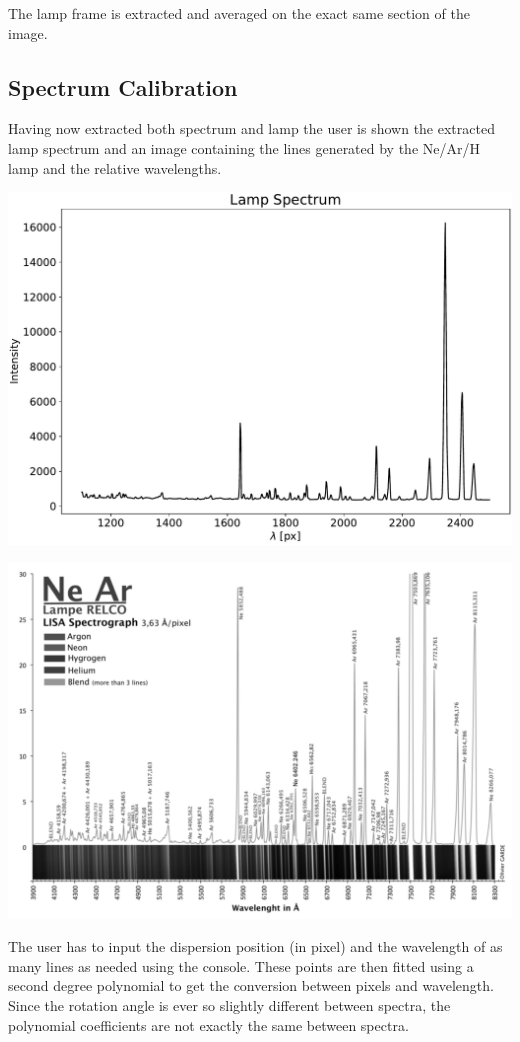\documentclass[a4paper]{article}
\newenvironment{Figure}
	{\par\medskip\noindent\minipage{\linewidth}}
	{\endminipage\par\medskip}
\begin{document}
\begin{multicols}{2}
			The lamp frame is extracted and averaged on the exact same section of the image.\\
			
		\subsection{Spectrum Calibration}
			Having now extracted both spectrum and lamp the user is shown the extracted lamp spectrum and an image containing the lines generated by the Ne/Ar/H lamp and the relative wavelengths.\\
			\begin{Figure}
				\centering
				\includegraphics[width=\linewidth]{Lamp_spectr.pdf}
				\label{fig:lamp_s}
			\end{Figure}
			\begin{Figure}
				\centering
				\includegraphics[width=\linewidth]{Lamp_image.pdf}
				\label{fig:lamp_i}
			\end{Figure}
			The user has to input the dispersion position (in pixel) and the wavelength of as many lines as needed using the console. These points are then fitted using a second degree polynomial to get the conversion between pixels and wavelength.\\
			Since the rotation angle is ever so slightly different between spectra, the polynomial coefficients are not exactly the same between spectra.\\
			

\end{multicols}
\end{document}
